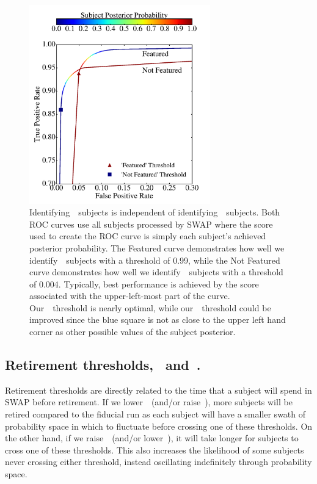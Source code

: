 \begin{figure}
\begin{center}
\includegraphics[width=3.08in]{Figures/human_machine/A2a.pdf}
\caption[Receivor operating characteristic curve for the chosen SWAP retirement thresholds.]{Identifying~\feat~subjects is independent of identifying~\notfeat~subjects.  Both ROC curves use all subjects processed by SWAP where the score used to create the ROC curve is simply each subject's achieved posterior probability. The Featured curve demonstrates how well we identify~\feat~subjects with a threshold of 0.99, while the Not Featured curve demonstrates how well we identify~\notfeat~subjects with a threshold of 0.004. Typically, best performance is achieved by the score associated with the upper-left-most part of the curve. Our~\feat~threshold is nearly optimal, while our~\notfeat~threshold could be improved since the blue square is not as close to the upper left hand corner as other possible values of the subject posterior.}
\label{fig: morph thresh}
\end{center}
\end{figure}

\subsection{Retirement thresholds, \tf~and~\tn.}
Retirement thresholds are directly related to the time that a subject will spend in SWAP before retirement. If we lower~\tf~(and/or raise~\tn), more subjects will be retired compared to the fiducial run as each subject will have a smaller swath of probability space in which to fluctuate before crossing one of these thresholds. On the other hand, if we raise~\tf~(and/or lower~\tn), it will take longer for subjects to cross one of these thresholds. This also increases the likelihood of some subjects never crossing either threshold, instead oscillating indefinitely through probability space.

